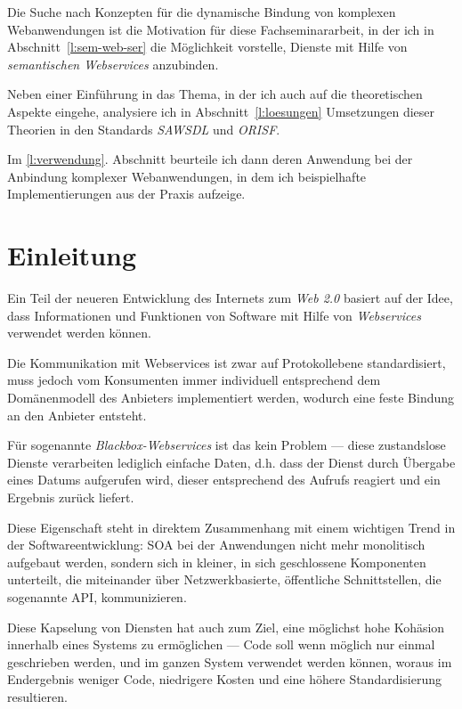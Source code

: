 \documentclass[10pt,a4paper]{article}
\begin{document}
Die Suche nach Konzepten für die dynamische Bindung von komplexen Webanwendungen
ist die Motivation für diese Fachseminararbeit, in der ich in Abschnitt~\ref{l:sem-web-ser} 
die Möglichkeit vorstelle, Dienste mit Hilfe von \emph{semantischen Webservices} 
anzubinden. 

Neben einer Einführung in das Thema, in der ich auch auf die theoretischen Aspekte
eingehe, analysiere ich in Abschnitt~\ref{l:loesungen} Umsetzungen dieser Theorien 
in den Standards \emph{\ac{SAWSDL}} und \emph{\ac{ORISF}}.

Im \ref{l:verwendung}. Abschnitt beurteile ich dann deren Anwendung bei der Anbindung 
komplexer Webanwendungen, in dem ich beispielhafte Implementierungen aus der Praxis aufzeige.

\pagebreak

\tableofcontents

\section{Einleitung}
\label{l:einleitung}

Ein Teil der neueren Entwicklung des Internets zum \emph{Web 2.0} basiert auf der Idee, dass 
Informationen und Funktionen von Software mit Hilfe von \emph{Webservices} verwendet werden 
können.

Die Kommunikation mit Webservices ist zwar auf Protokollebene standardisiert, muss jedoch 
vom Konsumenten immer individuell entsprechend dem Domänenmodell des Anbieters implementiert 
werden, wodurch eine feste Bindung an den Anbieter entsteht. \cite{ka-cots}

Für sogenannte \emph{Blackbox-Webservices} ist das kein Problem --- diese zustandslose Dienste 
verarbeiten lediglich einfache Daten, d.h. dass der Dienst durch Übergabe eines Datums aufgerufen 
wird, dieser entsprechend des Aufrufs reagiert und ein Ergebnis zurück liefert.

Diese Eigenschaft steht in direktem Zusammenhang mit einem wichtigen Trend in der Softwareentwicklung:
\ac{SOA} bei der Anwendungen nicht mehr monolitisch aufgebaut werden, sondern sich in kleiner, in sich 
geschlossene Komponenten unterteilt, die miteinander über Netzwerkbasierte, öffentliche Schnittstellen, 
die sogenannte \ac{API}, kommunizieren.

Diese Kapselung von Diensten hat auch zum Ziel, eine möglichst hohe Kohäsion innerhalb eines Systems 
zu ermöglichen --- Code soll wenn möglich nur einmal geschrieben werden, und im ganzen System verwendet
werden können, woraus im Endergebnis weniger Code, niedrigere Kosten und eine höhere Standardisierung 
resultieren. \cite{hn-web20}
\end{document}

